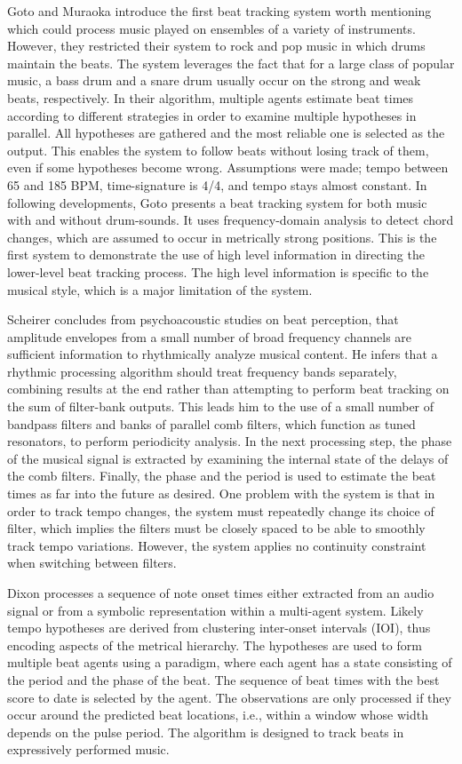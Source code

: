 \documentclass{scrartcl}
\begin{document}
Goto and Muraoka \cite{Goto1994} introduce the first beat tracking system worth mentioning which could process music played on ensembles of a variety of instruments. However, they restricted their system to rock and pop music in which drums maintain the beats. The system leverages the fact that for a large class of popular music, a bass drum and a snare drum usually occur on the strong and weak beats, respectively. In their algorithm, multiple agents estimate beat times according to different strategies in order to examine multiple hypotheses in parallel. All hypotheses are gathered and the most reliable one is selected as the output. This enables the system to follow beats without losing track of them, even if some hypotheses become wrong. Assumptions were made; tempo between 65 and 185 BPM, time-signature is 4/4, and tempo stays almost constant. In following developments, Goto \cite{Goto2001} presents a beat tracking system for both music with and without drum-sounds. It uses frequency-domain analysis to detect chord changes, which are assumed to occur in metrically strong positions. This is the first system to demonstrate the use of high level information in directing the lower-level beat tracking process. The high level information is specific to the musical style, which is a major limitation of the system.  

Scheirer \cite{Scheirer1998} concludes from psychoacoustic studies on beat perception, that amplitude envelopes from a small number of broad frequency channels are sufficient information to rhythmically analyze musical content. He infers that a rhythmic processing algorithm should treat frequency bands separately, combining results at the end rather than attempting to perform beat tracking on the sum of filter-bank outputs. This leads him to the use of a small number of bandpass filters and banks of parallel comb filters, which function as tuned resonators, to perform periodicity analysis. In the next processing step, the phase of the musical signal is extracted by examining the internal state of the delays of the comb filters. Finally, the phase and the period is used to estimate the beat times as far into the future as desired. One problem with the system is that in order to track tempo changes, the system must repeatedly change its choice of filter, which implies the filters must be closely spaced to be able to smoothly track tempo variations. However, the system applies no continuity constraint when switching between filters.  

Dixon \cite{Dixon2001} processes a sequence of note onset times either extracted from an audio signal or from a symbolic representation within a multi-agent system. Likely tempo hypotheses are derived from clustering inter-onset intervals (IOI), thus encoding aspects of the metrical hierarchy. The hypotheses are used to form multiple beat agents using a paradigm, where each agent has a state consisting of the period and the phase of the beat. The sequence of beat times with the best score to date is selected by the agent. The observations are only processed if they occur around the predicted beat locations, i.e., within a window whose width depends on the pulse period. The algorithm is designed to track beats in expressively performed music.
\end{document}
